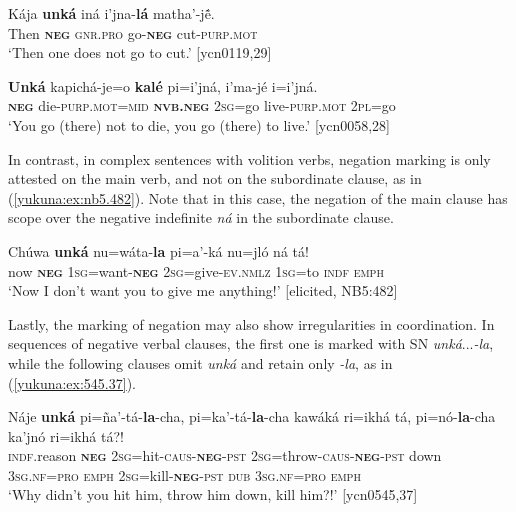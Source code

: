 \documentclass[output=paper,colorlinks,citecolor=brown]{langscibook}
\begin{document}
\ea\label{yukuna:ex:119.29}
\gll Kája \textbf{unká} iná i'jna-\textbf{lá} matha'-jẽ́.\\
Then \textbf{\textsc{neg}} \textsc{gnr.pro} go-\textbf{\textsc{neg}} cut-\textsc{purp.mot} \\
\glt ‘Then one does not go to cut.’ [ycn0119,29]
\z

\ea\label{yukuna:ex:58.28b}
\gll \textbf{Unká} kapichá-je=o \textbf{kalé} pi=i'jná, i'ma-jé i=i'jná.\\
\textbf{\textsc{neg}} die-\textsc{purp.mot}=\textsc{mid} \textbf{\textsc{nvb.neg}} \textsc{2sg}=go live-\textsc{purp.mot} \textsc{2pl}=go\\
\glt ‘You go (there) not to die, you go (there) to live.’ [ycn0058,28] 
\z

In contrast, in complex sentences with volition verbs, negation marking is only attested on the main verb, and not on the subordinate clause, as in (\ref{yukuna:ex:nb5.482}). Note that in this case, the negation of the main clause has scope over the negative indefinite \textit{ná} in the subordinate clause.  

\ea\label{yukuna:ex:nb5.482}
\gll Chúwa \textbf{unká} nu=wáta-\textbf{la} pi=a'-ká nu=jló ná tá!\\
now \textbf{\textsc{neg}} \textsc{1sg}=want-\textbf{\textsc{neg}} \textsc{2sg}=give-\textsc{ev.nmlz} \textsc{1sg}=to \textsc{indf} \textsc{emph}\\
\glt ‘Now I don't want you to give me anything!’  [elicited, NB5:482]
\z

Lastly, the marking of negation may also show irregularities in coordination. In sequences of negative verbal clauses, the first one is marked with SN \textit{unká}{...}\textit{-la}, while the following clauses omit \textit{unká} and retain only \textit{-la}, as in (\ref{yukuna:ex:545.37}).

\ea\label{yukuna:ex:545.37}
\gll Náje \textbf{unká} pi=ña'-tá-\textbf{la}-cha, pi=ka'-tá-\textbf{la}-cha kawáká ri=ikhá tá, pi=nó-\textbf{la}-cha ka'jnó ri=ikhá tá?!\\
\textsc{indf.}reason \textbf{\textsc{neg}} \textsc{2sg}=hit-\textsc{caus}-\textbf{\textsc{neg}}-\textsc{pst} \textsc{2sg}=throw-\textsc{caus}-\textbf{\textsc{neg}}-\textsc{pst} down \textsc{3sg.nf=pro} \textsc{emph} \textsc{2sg}=kill-\textbf{\textsc{neg}}-\textsc{pst} \textsc{dub} \textsc{3sg.nf=pro} \textsc{emph}\\
\glt ‘Why didn't you hit him, throw him down, kill him?!’  [ycn0545,37]
\z
\end{document}
